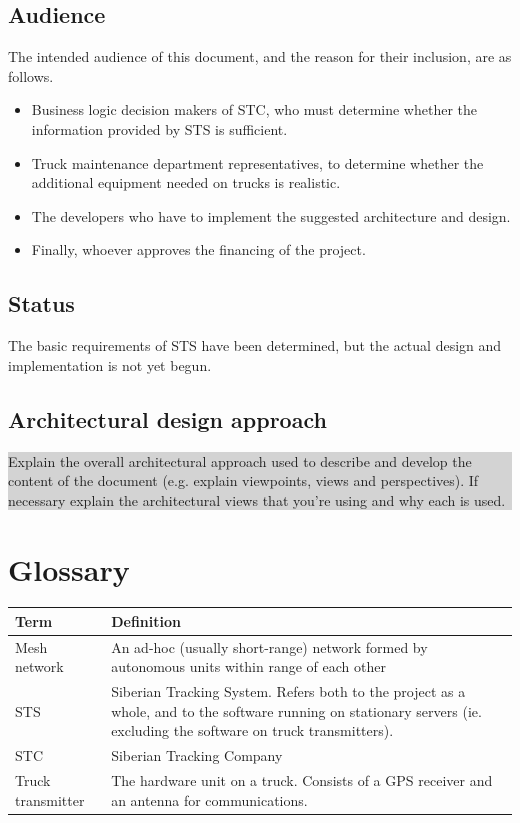 \documentclass[a4paper,11pt]{report}
\newcommand{\instructions}[1]{
  \noindent\colorbox{lightgray}{%
    \parbox{\linewidth}{%
      #1
    }%
  }%
 \vspace{0.1cm}
}
\begin{document}
\section{Audience}
\label{sec:audience}

The intended audience of this document, and the reason for their
inclusion, are as follows.

\begin{itemize}
  \item Business logic decision makers of STC, who must determine
    whether the information provided by STS is sufficient.
  \item Truck maintenance department representatives, to determine
    whether the additional equipment needed on trucks is realistic.
  \item The developers who have to implement the suggested architecture and design.
  \item Finally, whoever approves the financing of the project.
\end{itemize}

\section{Status}
\label{sec:status}

The basic requirements of STS have been determined, but the actual
design and implementation is not yet begun.

\section{Architectural design approach}
\label{sec:arch-design-appr}

\instructions{
  Explain the overall architectural approach used to describe and
  develop the content of the document (e.g. explain viewpoints, views
  and perspectives). If necessary explain the architectural views that
  you’re using and why each is used.
}

\chapter{Glossary}
\label{cha:glossary}
\thispagestyle{fancy}

\begin{center}
  \begin{tabular}[h!]{| p{} | p{} |}
    \hline
    \rowcolor{gray}
    Term & Definition \\
    \hline
    \hline
    Mesh network & An ad-hoc (usually short-range) network formed by autonomous units within range of each other \\\hline
    STS & Siberian Tracking System.  Refers both to the project as a whole, and to the software running on stationary servers (ie. excluding the software on truck transmitters). \\\hline
    STC & Siberian Tracking Company \\\hline
    Truck transmitter & The hardware unit on a truck.  Consists of a GPS receiver and an antenna for communications. \\\hline
  \end{tabular}
\end{center}
\end{document}

